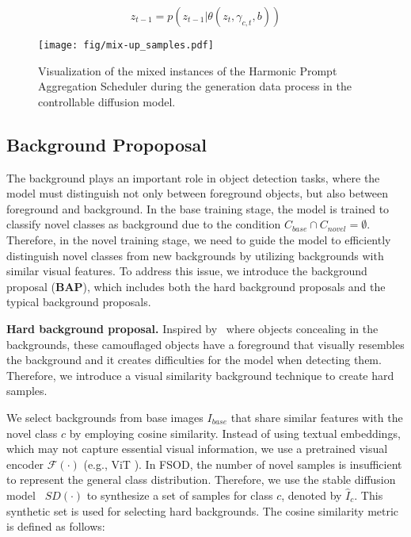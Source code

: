 \begin{equation}
\label{eq:mix-CD}
   z_{t-1} = p(z_{t-1}|\theta(z_t, \gamma_{c,t}, b))
\end{equation}


\begin{figure}[t]
    \centering
    \texttt{[image: fig/mix-up\_samples.pdf]}
    \caption{Visualization of the mixed instances of the Harmonic Prompt Aggregation Scheduler during the generation data process in the controllable diffusion model.}
     \label{fig:mix-up_samples}
\end{figure}

\subsection{Background Propoposal}

The background plays an important role in object detection tasks, where the model must distinguish not only between foreground objects, but also between foreground and background. In the base training stage, the model is trained to classify novel classes as background due to the condition $C_{base} \cap C_{novel} = \emptyset$. Therefore, in the novel training stage, we need to guide the model to efficiently distinguish novel classes from new backgrounds by utilizing backgrounds with similar visual features. To address this issue, we introduce the background proposal (\textbf{BAP}), which includes both the hard background proposals and the typical background proposals.

\textbf{Hard background proposal.} Inspired by~\cite{le2019anabranch} where objects concealing in the backgrounds, these camouflaged objects have a foreground that visually resembles the background and it creates difficulties for the model when detecting them. Therefore, we introduce a visual similarity background technique to create hard samples.  

We select backgrounds from base images $I_{base}$ that share similar features with the novel class $c$ by employing cosine similarity. Instead of using textual embeddings, which may not capture essential visual information, we use a pretrained visual encoder $\mathcal{F}(\cdot)$ (e.g., ViT \citep{dosovitskiy2020image}). In FSOD, the number of novel samples is insufficient to represent the general class distribution. Therefore, we use the stable diffusion model~\citep{rombach2022high} $SD(\cdot)$ to synthesize a set of samples for class $c$, denoted by $\hat{I}_{c}$. This synthetic set is used for selecting hard backgrounds. The cosine similarity metric is defined as follows:


